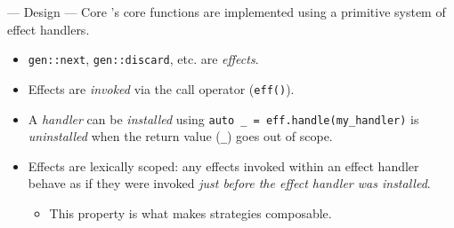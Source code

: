 \begin{frame}{\halcheck{} --- Design --- Core}
  \halcheck{}'s core functions are implemented using a primitive system of \alert{effect handlers}.

  \begin{itemize}
    \item<+-> \texttt{gen::next}, \texttt{gen::discard}, etc. are \emph{effects}.
    \item<+-> Effects are \emph{invoked} via the call operator (\texttt{eff()}).
    \item<+-> A \emph{handler} can be \emph{installed} using \texttt{auto _ = eff.handle(my_handler)} is \emph{uninstalled} when the return value (\texttt{_}) goes out of scope.
    \item<+-> Effects are \alert{lexically scoped}: any effects invoked within an effect handler behave as if they were invoked \emph{just before the effect handler was installed}.
      \begin{itemize}
        \item This property is what makes strategies composable.
      \end{itemize}
  \end{itemize}
\end{frame}

